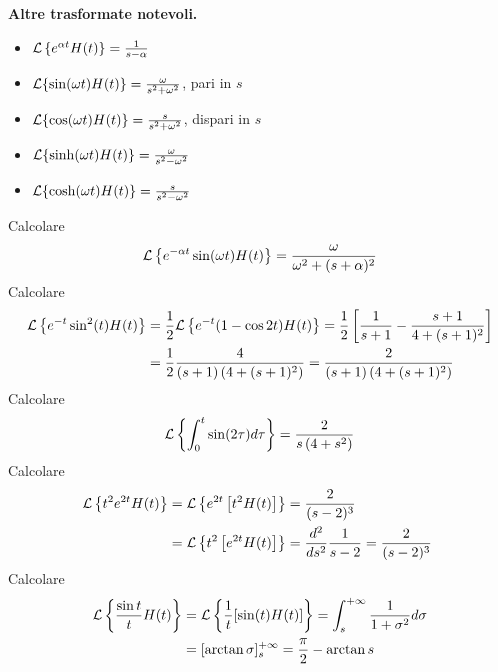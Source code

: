 \textbf{Altre trasformate notevoli.}
\begin{itemize}
\item $\mathcal{L}\left\{e^{\alpha t} H( t)\right\} =\frac{1}{s-\alpha }$
\item $\mathcal{L}\{\sin( \omega t) H( t)\} =\frac{\omega }{s^{2} +\omega ^{2}}$, pari in $s$
\item $\mathcal{L}\{\cos( \omega t) H( t)\} =\frac{s}{s^{2} +\omega ^{2}}$, dispari in $s$
\item $\mathcal{L}\{\sinh( \omega t) H( t)\} =\frac{\omega }{s^{2} -\omega ^{2}}$
\item $\mathcal{L}\{\cosh( \omega t) H( t)\} =\frac{s}{s^{2} -\omega ^{2}}$
\end{itemize}
\Esercizio{}

Calcolare
\begin{equation*}
\mathcal{L}\left\{e^{-\alpha t}\sin( \omega t) H( t)\right\} =\frac{\omega }{\omega ^{2} +( s+\alpha )^{2}}
\end{equation*}
Calcolare
\begin{equation*}
\begin{aligned}
\mathcal{L}\left\{e^{-t}\sin^{2}( t) H( t)\right\} & =\frac{1}{2}\mathcal{L}\left\{e^{-t}( 1-\cos 2t) H( t)\right\} =\frac{1}{2}\left[\frac{1}{s+1} -\frac{s+1}{4+( s+1)^{2}}\right]\\
 & =\frac{1}{2}\frac{4}{( s+1)\left( 4+( s+1)^{2}\right)} =\frac{2}{( s+1)\left( 4+( s+1)^{2}\right)}
\end{aligned}
\end{equation*}
Calcolare
\begin{equation*}
\mathcal{L}\left\{\int ^{t}_{0}\sin( 2\tau ) d\tau \right\} =\frac{2}{s\left( 4+s^{2}\right)}
\end{equation*}
Calcolare
\begin{equation*}
\begin{aligned}
\Lc\left\{t^{2} e^{2t} H( t)\right\} & =\Lc\left\{e^{2t}\left[ t^{2} H( t)\right]\right\} =\frac{2}{( s-2)^{3}}\\
 & =\Lc\left\{t^{2}\left[ e^{2t} H( t)\right]\right\} =\frac{d^{2}}{ds^{2}}\frac{1}{s-2} =\frac{2}{( s-2)^{3}} \ 
\end{aligned}
\end{equation*}
Calcolare
\begin{equation*}
\begin{aligned}
\mathcal{L}\left\{\frac{\sin t}{t} H( t)\right\} & =\mathcal{L}\left\{\frac{1}{t}[\sin( t) H( t)]\right\} =\int ^{+\infty }_{s}\frac{1}{1+\sigma ^{2}} d\sigma \\
 & =[\arctan \sigma ]^{+\infty }_{s} =\frac{\pi }{2} -\arctan s
\end{aligned}
\end{equation*}
\Esercizio{}

